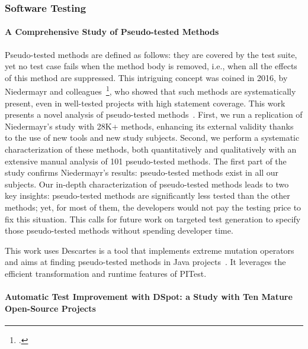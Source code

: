 \subsubsection{Software Testing}

\paragraph{A Comprehensive Study of Pseudo-tested Methods}

Pseudo-tested methods are defined as follows: they are covered by the test suite, yet no test case fails when the method body is removed, i.e., when all the effects of this method are suppressed. This intriguing concept was coined in 2016, by Niedermayr and colleagues~\footcite{niedermayr2016}, who showed that such methods are systematically present, even in well-tested projects with high statement coverage. This work presents a novel analysis of pseudo-tested methods~\cite{veraperez:hal-01867423}. First, we run a replication of Niedermayr's study with 28K+ methods, enhancing its external validity thanks to the use of new tools and new study subjects. Second, we perform a systematic characterization of these methods, both quantitatively and qualitatively with an extensive manual analysis of 101 pseudo-tested methods. The first part of the study confirms Niedermayr's results: pseudo-tested methods exist in all our subjects. Our in-depth characterization of pseudo-tested methods leads to two key insights: pseudo-tested methods are significantly less tested than the other methods; yet, for most of them, the developers would not pay the testing price to fix this situation. This calls for future work on targeted test generation to specify those pseudo-tested methods without spending developer time. 

This work uses Descartes is a tool that implements extreme mutation operators and aims at finding pseudo-tested methods in Java projects~\cite{veraperez:hal-01870976}. It leverages the efficient transformation and runtime features of PITest.


\paragraph{Automatic Test Improvement with DSpot: a Study with Ten Mature Open-Source Projects}

